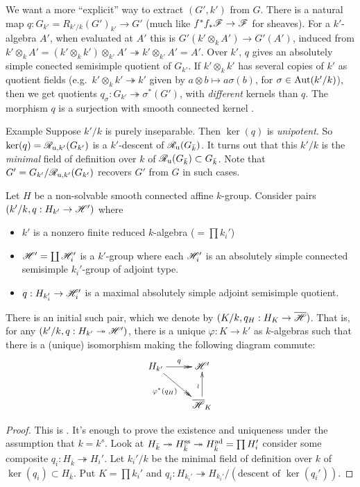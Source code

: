 We want a more ``explicit'' way to extract $(G',k')$ from $G$. There is a 
natural map $q:G_{k'}  = R_{k'/k}(G')_{k'} \to G'$ (much like 
$f^\ast f_\ast \mathscr{F} \to \mathscr{F}$ for sheaves). For a $k'$-algebra $A'$, when 
evaluated at $A'$ this is $G'(k'\otimes_k A') \to G'(A')$, induced from 
$k'\otimes_k A' = (k'\otimes_k k')\otimes_{k'} A' \twoheadrightarrow k'\otimes_{k'} A' = A'$. 
Over $k'$, $q$ gives an absolutely simple conected semisimple quotient of 
$G_{k'}$. If $k'\otimes_k k'$ has several copies of $k'$ as quotient fields 
(e.g.\ $k'\otimes_k k' \twoheadrightarrow k'$ given by 
$a\otimes b\mapsto a\sigma(b)$, for $\sigma\in \operatorname{Aut}(k'/k)$), then we 
get quotients $q_\sigma:G_{k'}\twoheadrightarrow \sigma^\ast (G')$, with 
\emph{different} kernels than $q$. The morphism $q$ is a surjection with 
smooth connected kernel \cite[A.5.11(1,3)]{cgp10}. 

\begin{enonce}[remark]{Example}
Suppose $k'/k$ is purely inseparable. Then $\ker(q)$ is \emph{unipotent}. So 
$\ker(q)=\mathscr{R}_{\mathrm{u},k'}(G_{k'})$ is a $k'$-descent of $\mathscr{R}_\mathrm{u}(G_{\bar k})$. 
It turns out that this $k'/k$ is the \emph{minimal} field of definition over 
$k$ of $\mathscr{R}_{\mathrm{u}}(G_{\bar k})\subset G_{\bar k}$. Note that 
$G'=G_{k'}/\mathscr{R}_{\mathrm{u},k'}(G_{k'})$ recovers $G'$ from $G$ in such cases. 
\end{enonce}

\begin{prop}
Let $H$ be a non-solvable smooth connected affine $k$-group. Consider pairs 
$(k'/k,q:H_{k'} \to \mathscr{H}')$ where 
\begin{itemize}
  \item $k'$ is a nonzero finite reduced $k$-algebra ($=\prod k_i'$)
  \item $\mathscr{H}'=\coprod \mathscr{H}_i'$ is a $k'$-group where each $\mathscr{H}_i'$ is 
    an absolutely simple connected semisimple $k_i'$-group of adjoint type. 
  \item $q:H_{k_i'} \to \mathscr{H}_i'$ is a maximal absolutely simple adjoint 
    semisimple quotient. 
\end{itemize}
There is an initial such pair, which we denote by 
$(K/k, q_H:H_K \to \overline{\mathscr{H}})$. That is, for any 
$(k'/k,q:H_{k'} \twoheadrightarrow \mathscr{H}')$, there is a unique 
$\varphi:K \to k'$ as $k$-algebras such that there is a (unique) isomorphism 
making the following diagram commute:
\[\xymatrix{
  H_{k'} \ar@{->>}[r]^-{q} \ar@{->>}[dr]_-{\varphi^\ast(q_H)} 
    & \sH' \\
  & \overline \sH_K \ar[u]^\wr
}\]
\end{prop}
\begin{proof}
This is \cite[4.2.1]{cgp10}. It's enough to prove the existence and uniqueness 
under the assumption that $k=k^s$. Look at 
$H_{\bar k} \twoheadrightarrow H_{\bar k}^\mathrm{ss}\twoheadrightarrow H_{\bar k}^{\operatorname{ad}} = \prod H_i'$ consider some composite 
$q_i:H_{\bar k}\twoheadrightarrow H_i'$. Let $k_i'/k$ be the minimal field of 
definition over $k$ of $\ker(q_i)\subset H_{\bar k}$. Put 
$K=\prod k_i'$ and $q_i:H_{k_i'}\twoheadrightarrow H_{k_i'}/(\text{descent of }\ker(q_i'))$. 
\end{proof}

